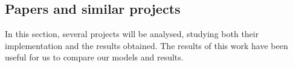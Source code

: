 \subsection{Papers and similar projects}\label{similar_projects}

In this section, several projects will be analysed, studying both their implementation and the results obtained. The results of this work have been useful for us to compare our models and results.




